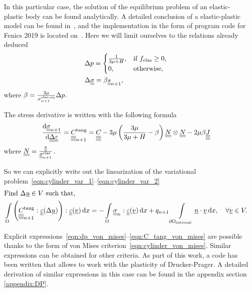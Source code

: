 \documentclass[12pt]{article}
\begin{document}
In this particular case, the solution of the equilibrium problem of an elastic-plastic body can be found analytically. A detailed conclusion of a elastic-plastic model can be found in~\parencite{bonnet:hal-01083772}, and the implementation in the form of program code for Fenics 2019 is located on~\parencite{bleyer2018numericaltours}. Here we will limit ourselves to the relations already deduced
\begin{align}
    &\Delta p = 
    \begin{cases}
        \frac{1}{3\mu + H}, & \text{if } f_\text{elas} \geq 0,\\
        0, & \text{otherwise},
    \end{cases} \label{eqn:dp_von_mises}\\
    &\Delta\underline{\underline{\sigma}} = \beta\underline{\underline{s}}_{n+1}, \label{eqn:dsigma_von_mises}
\end{align}
where $\beta = \frac{3\mu}{\sigma_{n+1}^\text{elas,eq}}\Delta p$.

The stress derivative is written with the following formula
\begin{equation}
    \dfrac{\mathrm{d}\underline{\underline{\sigma}}_{n+1}}{\mathrm{d}\underline{\underline{\Delta\varepsilon}}} = \underline{\underline{\underline{\underline{C_{}}}}}_{n+1}^{\text{tang}} = \underline{\underline{\underline{\underline{C_{}}}}} - 3\mu \left( \frac{3\mu}{3\mu + H} -\beta \right) \underline{\underline{N}} \otimes \underline{\underline{N}} - 2\mu\beta\underline{\underline{\underline{\underline{J}}}} \label{eqn:C_tang_von_mises}
\end{equation}
where $\underline{\underline{N}} = \frac{\underline{\underline{s}}}{\underline{\underline{\sigma}}_{n+1}^{\text{elas}}}$.

So we can explicitly write out the linearization of the variational problem~\ref{eqn:cylinder_var_1}--\ref{eqn:cylinder_var_2}
\begin{align}
    & \text{Find } \Delta\underline{u} \in V \text{ such that,} \label{eqn:cylinder_lin_var_from_1} \\ 
    & \int\limits_\Omega \left( \underline{\underline{\underline{\underline{C_{}}}}}_{n+1}^\text{tang} : \underline{\underline{\varepsilon}}(\Delta\underline{u}) \right) : \underline{\underline{\varepsilon}}(\underline{v}) \, \mathrm{d} x = -\int\limits_\Omega\underline{\underline{\sigma}}_n : \underline{\underline{\varepsilon}}(\underline{v}) \, \mathrm{d} x + q_{n+1}\int\limits_{\partial\Omega_\text{internal}}\underline{n} \cdot \underline{v} \, \mathrm{d} x, \quad \forall \underline{v} \in V. \label{eqn:cylinder_lin_var_from_2} 
\end{align}

Explicit expressions~\ref{eqn:dp_von_mises}--\ref{eqn:C_tang_von_mises} are possible thanks to the form of von Mises criterion~\ref{eqn:cylinder_von_mises}. Similar expressions can be obtained for other criteria. As part of this work, a code has been written that allows to work with the plasticity of Drucker-Prager. A detailed derivation of similar expressions in this case can be found in the appendix section \ref{appendix:DP}.
\end{document}
